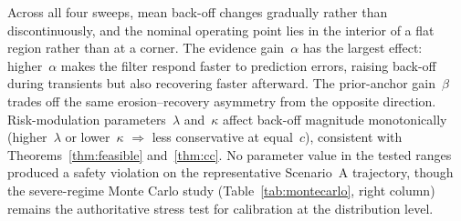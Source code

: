 Across all four sweeps, mean back-off changes gradually rather than
discontinuously, and the nominal operating point lies in the interior of a
flat region rather than at a corner.
The evidence gain~$\alpha$ has the largest effect: higher~$\alpha$ makes
the filter respond faster to prediction errors, raising back-off during
transients but also recovering faster afterward.
The prior-anchor gain~$\beta$ trades off the same erosion--recovery asymmetry
from the opposite direction.
Risk-modulation parameters~$\lambda$ and~$\kappa$ affect back-off magnitude
monotonically (higher~$\lambda$ or lower~$\kappa$ $\Rightarrow$ less
conservative at equal~$c$), consistent with Theorems~\ref{thm:feasible}
and~\ref{thm:cc}.
No parameter value in the tested ranges produced a safety violation on the
representative Scenario~A trajectory, though the severe-regime Monte Carlo
study (Table~\ref{tab:montecarlo}, right column) remains the authoritative
stress test for calibration at the distribution level.



% 



%
%


